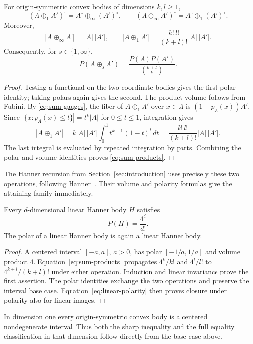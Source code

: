 \begin{lemma}\label{lem:sums}
For origin-symmetric convex bodies of dimensions $k,l\ge1$,
\begin{equation}\label{eq:sum-polars}
 (A\oplus_1 A')^\circ=A^\circ\oplus_\infty(A')^\circ,
 \qquad
 (A\oplus_\infty A')^\circ=A^\circ\oplus_1(A')^\circ.
\end{equation}
Moreover,
\begin{equation}\label{eq:sum-volumes}
 |A\oplus_\infty A'|=|A|\,|A'|,
 \qquad
 |A\oplus_1 A'|=\frac{k!\,l!}{(k+l)!}|A|\,|A'|.
\end{equation}
Consequently, for $s\in\{1,\infty\}$,
\begin{equation}\label{eq:sum-products}
 P(A\oplus_s A')=\frac{P(A)P(A')}{\binom{k+l}{k}}.
\end{equation}
\end{lemma}

\begin{proof}
Testing a functional on the two coordinate bodies gives the first
polar identity; taking polars again gives the second. The product
volume follows from Fubini. By \eqref{eq:sum-gauges}, the fiber of
$A\oplus_1 A'$ over $x\in A$ is $(1-p_A(x))A'$. Since
$|\{x:p_A(x)\le t\}|=t^k|A|$ for $0\le t\le1$, integration gives
\[
 |A\oplus_1 A'|
 =k|A|\,|A'|\int_0^1t^{k-1}(1-t)^l\,dt
 =\frac{k!\,l!}{(k+l)!}|A|\,|A'|.
\]
The last integral is evaluated by repeated integration by parts.
Combining the polar and volume identities proves
\eqref{eq:sum-products}.
\end{proof}

The Hanner recursion from Section~\ref{sec:introduction} uses precisely
these two operations, following Hanner~\cite{Hanner1956}. Their volume and polarity formulas give the
attaining family immediately.

\begin{lemma}\label{lem:hanner}
Every $d$-dimensional linear Hanner body $H$ satisfies
\[
 P(H)=\frac{4^d}{d!}.
\]
The polar of a linear Hanner body is again a linear Hanner body.
\end{lemma}

\begin{proof}
A centered interval $[-a,a]$, $a>0$, has polar $[-1/a,1/a]$ and
volume product $4$. Equation~\eqref{eq:sum-products} propagates
$4^k/k!$ and $4^l/l!$ to $4^{k+l}/(k+l)!$ under either operation.
Induction and linear invariance prove the first assertion. The polar
identities exchange the two operations and preserve the interval
base case. Equation~\eqref{eq:linear-polarity} then proves closure
under polarity also for linear images.
\end{proof}

In dimension one every origin-symmetric convex body is a centered
nondegenerate interval. Thus both the sharp inequality and the full
equality classification in that dimension follow directly from the
base case above.
